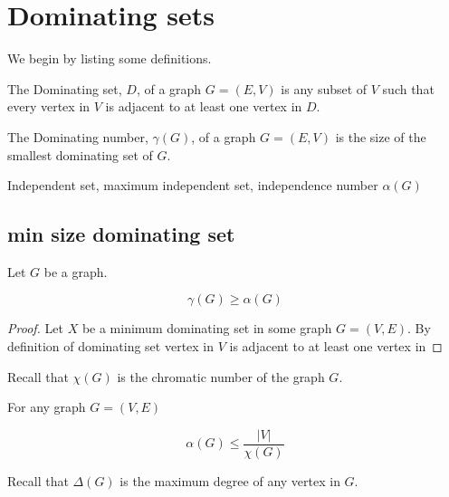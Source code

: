 \chapter{Dominating sets}

We begin by listing some definitions.

\begin{definition}
    The Dominating set, $D$, of a graph $G=(E,V)$ is any subset of $V$ such that every vertex in $V$ is adjacent to at least one vertex in $D$.
\end{definition}

\begin{definition}
    The Dominating number, $\gamma(G)$, of a graph $G=(E,V)$ is the size of the smallest dominating set of $G$.
\end{definition}

\begin{definition}
    Independent set, maximum independent set, independence number $\alpha(G)$
\end{definition}

\section{min size dominating set}

\begin{lemma}
    Let $G$ be a graph. 
        
    \[\gamma(G) \geq \alpha(G)\]
     
\end{lemma}

\begin{proof}
    
    Let $X$ be a minimum dominating set in some graph $G=(V,E)$. By definition of dominating set vertex in $V$ is adjacent to at least one vertex in      
   
\end{proof}
    
Recall that $\chi(G)$ is the chromatic number of the graph $G$.

\begin{theorem} [Willis 2011 3.1] 
For any graph $G = (V,E)$ \cite{Willis2011BoundsFT}

    \[\alpha(G) \leq \frac{ \left | {V} \right |}{\chi(G)}\]

\end{theorem}

Recall that $\Delta(G)$ is the maximum degree of any vertex in $G$.

